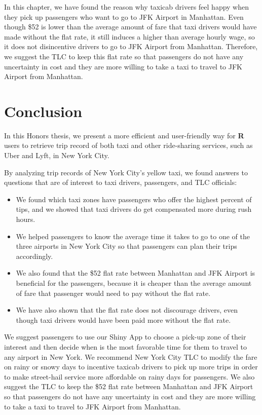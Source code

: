 \documentclass[12pt,twoside]{reedthesis}
\theoremstyle{definition}
\theoremstyle{definition}
\theoremstyle{definition}
\theoremstyle{remark}
\begin{document}
In this chapter, we have found the reason why taxicab drivers feel happy
when they pick up passengers who want to go to JFK Airport in Manhattan.
Even though \$52 is lower than the average amount of fare that taxi
drivers would have made without the flat rate, it still induces a higher
than average hourly wage, so it does not disincentive drivers to go to
JFK Airport from Manhattan. Therefore, we suggest the TLC to keep this
flat rate so that passengers do not have any uncertainty in cost and
they are more willing to take a taxi to travel to JFK Airport from
Manhattan.

\chapter{Conclusion}\label{chapter6}

In this Honors thesis, we present a more efficient and user-friendly way
for \textbf{R} users to retrieve trip record of both taxi and other
ride-sharing services, such as Uber and Lyft, in New York City.

By analyzing trip records of New York City's yellow taxi, we found
answers to questions that are of interest to taxi drivers, passengers,
and TLC officials:
\begin{itemize}
\item
  We found which taxi zones have passengers who offer the highest
  percent of tips, and we showed that taxi drivers do get compensated
  more during rush hours.
\item
  We helped passengers to know the average time it takes to go to one of
  the three airports in New York City so that passengers can plan their
  trips accordingly.
\item
  We also found that the \$52 flat rate between Manhattan and JFK
  Airport is beneficial for the passengers, because it is cheaper than
  the average amount of fare that passenger would need to pay without
  the flat rate.
\item
  We have also shown that the flat rate does not discourage drivers,
  even though taxi drivers would have been paid more without the flat
  rate.
\end{itemize}
We suggest passengers to use our Shiny App to choose a pick-up zone of
their interest and then decide when is the most favorable time for them
to travel to any airport in New York. We recommend New York City TLC to
modify the fare on rainy or snowy days to incentive taxicab drivers to
pick up more trips in order to make street-hail service more affordable
on rainy days for passengers. We also suggest the TLC to keep the \$52
flat rate between Manhattan and JFK Airport so that passengers do not
have any uncertainty in cost and they are more willing to take a taxi to
travel to JFK Airport from Manhattan.
\end{document}
